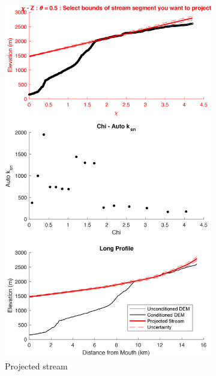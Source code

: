 \begin{figure}[H]
	\centering
	\begin{subfigure}{.5\textwidth}
		\centering
		\includegraphics[width=.8\linewidth]{PNGs/B402_ProjectedProfile_1.png}
		\caption{Projected stream}
		\label{fig:p1sub1}
	\end{subfigure}%
	\begin{subfigure}{.5\textwidth}
		\centering

\end{subfigure}
\end{figure}
